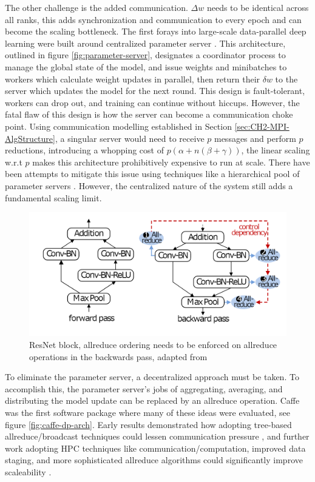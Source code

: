 The other challenge is the added communication.
$\Delta w$ needs to be identical across all ranks, this adds synchronization and communication to every epoch and can become the scaling bottleneck.
The first forays into large-scale data-parallel deep learning were built around centralized parameter server \cite{Dean2012DistBelif, Chilimbi2014ProjectAdam}.
This architecture, outlined in figure \ref{fig:parameter-server}, designates a coordinator process to manage the global state of the model, and issue weights and minibatches to workers which calculate weight updates in parallel, then return their $\delta w$ to the server which updates the model for the next round.
This design is fault-tolerant, workers can drop out, and training can continue without hiccups. 
However, the fatal flaw of this design is how the server can become a communication choke point.
Using communication modelling established in Section \ref{sec:CH2-MPI-AlgStructure}, a singular server would need to receive $p$ messages and perform $p$ reductions, introducing a whopping cost of $p(\alpha+n(\beta+\gamma))$, the linear scaling w.r.t $p$ makes this architecture prohibitively expensive to run at scale.
There have been attempts to mitigate this issue using techniques like a hierarchical pool of parameter servers \cite{Gupta2016Rudra}.
However, the centralized nature of the system still adds a fundamental scaling limit.

\begin{figure}
    \centering
    \includegraphics[width=15cm]{3_Chapters/3_Chapter_DistributedDL/Figs/ResNet_block_control_dependency.png}
    \caption{ResNet block, allreduce ordering needs to be enforced on allreduce operations in the backwards pass, adapted from \cite{Li2020DLPartialColl}}
    \label{fig:ResNet-controll-dependency}
\end{figure}

To eliminate the parameter server, a decentralized approach must be taken.
To accomplish this, the parameter server's jobs of aggregating, averaging, and distributing the model update can be replaced by an allreduce operation.
Caffe was the first software package where many of these ideas were evaluated, see figure \ref{fig:caffe-dp-arch}.
Early results demonstrated how adopting tree-based allreduce/broadcast techniques could lessen communication pressure \cite{Iandola2016FireCaffe}, and further work adopting HPC techniques like communication/computation, improved data staging, and more sophisticated allreduce algorithms could significantly improve scaleability \cite{Awan2017SCaffe}.

